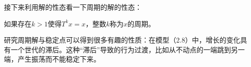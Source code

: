 接下来利用解的性态看一下周期的解的性态：

如果存在\begin{math}k>1\end{math}使得\begin{math}T^{k}x=x\end{math}，整数\begin{math}k\end{math}称为\begin{math}x\end{math}的周期。

研究周期解与稳定点可以得到很多有趣的性质：在模型（2.8）中，增长的变化具有一个世代的滞后。这种“滞后”导致的行为过渡，比如从不动点的一端跳到另一端，产生振荡而不能稳定下来。